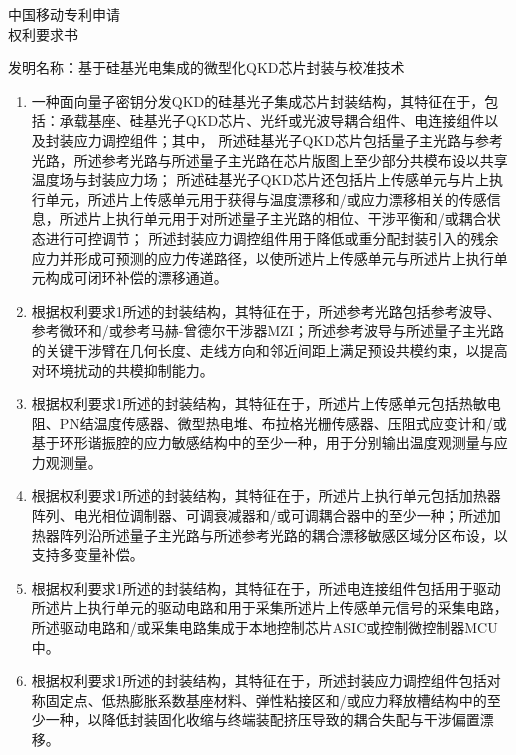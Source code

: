 \documentclass[12pt,a4paper]{article}
\begin{document}
\begin{center}
    {\Huge\heiti 中国移动专利申请} \\[0.5em]
    {\Huge\heiti 权利要求书} \\[1em]
\end{center}

\noindent
发明名称：基于硅基光电集成的微型化QKD芯片封装与校准技术

\vspace{0.8em}

\begin{enumerate}[label=\arabic*.,leftmargin=2em,itemsep=0.6em]

\item
一种面向量子密钥分发QKD的硅基光子集成芯片封装结构，其特征在于，包括：承载基座、硅基光子QKD芯片、光纤或光波导耦合组件、电连接组件以及封装应力调控组件；其中，
所述硅基光子QKD芯片包括量子主光路与参考光路，所述参考光路与所述量子主光路在芯片版图上至少部分共模布设以共享温度场与封装应力场；
所述硅基光子QKD芯片还包括片上传感单元与片上执行单元，所述片上传感单元用于获得与温度漂移和/或应力漂移相关的传感信息，所述片上执行单元用于对所述量子主光路的相位、干涉平衡和/或耦合状态进行可控调节；
所述封装应力调控组件用于降低或重分配封装引入的残余应力并形成可预测的应力传递路径，以使所述片上传感单元与所述片上执行单元构成可闭环补偿的漂移通道。

\item
根据权利要求1所述的封装结构，其特征在于，所述参考光路包括参考波导、参考微环和/或参考马赫-曾德尔干涉器MZI；所述参考波导与所述量子主光路的关键干涉臂在几何长度、走线方向和邻近间距上满足预设共模约束，以提高对环境扰动的共模抑制能力。

\item
根据权利要求1所述的封装结构，其特征在于，所述片上传感单元包括热敏电阻、PN结温度传感器、微型热电堆、布拉格光栅传感器、压阻式应变计和/或基于环形谐振腔的应力敏感结构中的至少一种，用于分别输出温度观测量与应力观测量。

\item
根据权利要求1所述的封装结构，其特征在于，所述片上执行单元包括加热器阵列、电光相位调制器、可调衰减器和/或可调耦合器中的至少一种；所述加热器阵列沿所述量子主光路与所述参考光路的耦合漂移敏感区域分区布设，以支持多变量补偿。

\item
根据权利要求1所述的封装结构，其特征在于，所述电连接组件包括用于驱动所述片上执行单元的驱动电路和用于采集所述片上传感单元信号的采集电路，所述驱动电路和/或采集电路集成于本地控制芯片ASIC或控制微控制器MCU中。

\item
根据权利要求1所述的封装结构，其特征在于，所述封装应力调控组件包括对称固定点、低热膨胀系数基座材料、弹性粘接区和/或应力释放槽结构中的至少一种，以降低封装固化收缩与终端装配挤压导致的耦合失配与干涉偏置漂移。


\end{enumerate}
\end{document}
